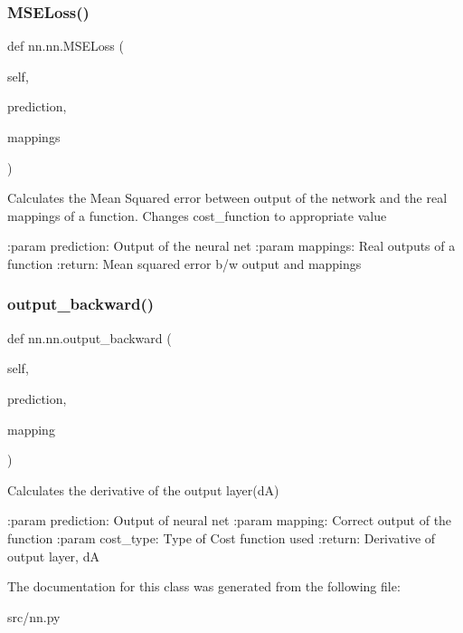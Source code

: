 \subsubsection{\texorpdfstring{M\+S\+E\+Loss()}{MSELoss()}}
{\footnotesize\ttfamily def nn.\+nn.\+M\+S\+E\+Loss (\begin{DoxyParamCaption}\item[{}]{self,  }\item[{}]{prediction,  }\item[{}]{mappings }\end{DoxyParamCaption})}

\begin{DoxyVerb}Calculates the Mean Squared error between output of the network and the real mappings of a function.
Changes cost_function to appropriate value

:param prediction: Output of the neural net
:param mappings: Real outputs of a function
:return: Mean squared error b/w output and mappings
\end{DoxyVerb}
 \mbox{\label{classnn_1_1nn_afa7d1462872fae95fe71f27ed00bf7ae}} 
\subsubsection{\texorpdfstring{output\+\_\+backward()}{output\_backward()}}
{\footnotesize\ttfamily def nn.\+nn.\+output\+\_\+backward (\begin{DoxyParamCaption}\item[{}]{self,  }\item[{}]{prediction,  }\item[{}]{mapping }\end{DoxyParamCaption})}

\begin{DoxyVerb}Calculates the derivative of the output layer(dA)

:param prediction: Output of neural net
:param mapping: Correct output of the function
:param cost_type: Type of Cost function used
:return: Derivative of output layer, dA  
\end{DoxyVerb}
 

The documentation for this class was generated from the following file\+:\begin{DoxyCompactItemize}
\item 
src/nn.\+py\end{DoxyCompactItemize}
